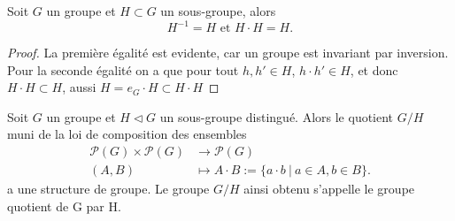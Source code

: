 \begin{lemma}
	\label{lem:inversion-involution}
	Soit $G$ un groupe et $H \subset G$ un sous-groupe, alors
	\begin{equation*}
		H^{-1} = H \textrm{ et } H \cdot H = H.
	\end{equation*}
\end{lemma}
\begin{proof}
	La première égalité est evidente, car un groupe est invariant par inversion.
	Pour la seconde égalité on a que pour tout $h, h' \in H$, $h \cdot h' \in H$,
	et donc $H \cdot H \subset H$, aussi $H = {e_G} \cdot H \subset H \cdot H$
\end{proof}

\begin{theorem}
	\label{thm:existence-groupe-quotient}
	Soit $G$ un groupe et $H \triangleleft G$ un sous-groupe distingué.
	Alors le quotient $G/H$ muni de la loi de composition des ensembles
	\begin{align*}
		\mathcal{P}(G) \times \mathcal{P}(G) &\to \mathcal{P}(G)\\
		(A, B) &\mapsto A \cdot B := \{a \cdot b\ |\ a \in A, b \in B\}.
	\end{align*}
	a une structure de groupe. Le groupe $G/H$ ainsi obtenu
	s'appelle le groupe quotient de G par H.
\end{theorem}

